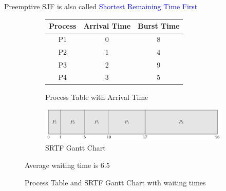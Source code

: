 \documentclass[oneside]{book}
\begin{document}
                Preemptive SJF is also called \textcolor{blue}{Shortest Remaining Time First}
                \begin{figure}[H]
                    \centering
                    \begin{subfigure}{0.5\linewidth}
                        \begin{tabular}{ccc}
                            Process & Arrival Time & Burst Time\\
                            \toprule
                            P1 & 0 & 8\\
                            P2 & 1 & 4\\
                            P3 & 2 & 9\\
                            P4 & 3 & 5\\
                        \end{tabular}
                        \caption{Process Table with Arrival Time}
                    \end{subfigure}%
                    \begin{subfigure}{0.5\linewidth}
                        \centering
                        \includegraphics[width=\linewidth]{figures/srtf_gantt_1.pdf}
                        \caption{SRTF Gantt Chart}
                    \end{subfigure}
                    Average waiting time is 6.5
                    \caption{Process Table and SRTF Gantt Chart with waiting times}
                \end{figure}
\end{document}
